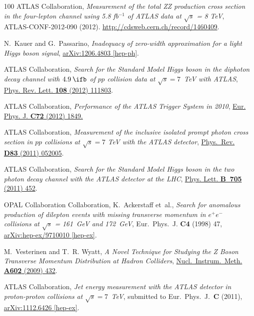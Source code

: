 \documentclass[final,3p,times,twocolumn]{elsarticle}
\begin{document}
\begin{thebibliography}{100}
{ATLAS Collaboration}, {\em Measurement of the total ZZ production cross
  section in the four-lepton channel using 5.8 fb$^{-1}$ of ATLAS data at
  $\sqrt{s}$ = 8 TeV}, {ATLAS-CONF-2012-090} (2012).
  \url{http://cdsweb.cern.ch/record/1460409}.

N.~Kauer and G.~Passarino, {\em {Inadequacy of zero-width approximation for a
  light Higgs boson signal}}, \href{http://arxiv.org/abs/1206.4803}{{\ttfamily
  arXiv:1206.4803 [hep-ph]}}.

{ATLAS Collaboration}, {\em {Search for the Standard Model Higgs boson in the
  diphoton decay channel with $4.9\:\ifb$ of $pp$ collision data at $\sqrt{s} =
  7$~TeV with ATLAS}},
  \href{http://dx.doi.org/10.1103/PhysRevLett.108.111803}{Phys. Rev. Lett.
  {\bfseries 108} (2012) 111803}.

{ATLAS Collaboration}, {\em {Performance of the ATLAS Trigger System in 2010}},
  \href{http://dx.doi.org/10.1140/epjc/s10052-011-1849-1}{Eur. Phys. J. {\bfseries C72} (2012) 1849.}

{ATLAS} Collaboration, {\em {Measurement of the inclusive isolated prompt
  photon cross section in $pp$ collisions at $\sqrt{s} = 7$ TeV with the ATLAS
  detector}}, \href{http://dx.doi.org/10.1103/PhysRevD.83.052005}{Phys.~Rev.
  {\bfseries D83} (2011) 052005}.

{ATLAS Collaboration}, {\em {Search for the Standard Model Higgs boson in the
  two photon decay channel with the ATLAS detector at the LHC}},
  \href{http://dx.doi.org/10.1016/j.physletb.2011.10.051}{Phys. Lett.
  {\bfseries B~705} (2011) 452}.

{OPAL Collaboration} Collaboration, K.~Ackerstaff {et~al.}, {\em {Search for
  anomalous production of dilepton events with missing transverse momentum in
  $e^+e^-$ collisions at $\sqrt{s}$ = 161~GeV and 172~GeV}},
  {Eur.~Phys.~J. {\bfseries C4}
  (1998) 47},
\href{http://arxiv.org/abs/hep-ex/9710010}{{\ttfamily arXiv:hep-ex/9710010
  [hep-ex]}}.

M.~Vesterinen and T.~R. Wyatt, {\em {A Novel Technique for Studying the Z Boson
  Transverse Momentum Distribution at Hadron Colliders}},
  \href{http://dx.doi.org/10.1016/j.nima.2009.01.203}{Nucl.~Instrum.~Meth.
  {\bfseries A602} (2009) 432}.

{ATLAS} Collaboration, {\em {Jet energy measurement with the ATLAS detector in
  proton-proton collisions at $\sqrt{s} = 7$~TeV}}, submitted to
  Eur.~Phys.~J.~{\bf C} (2011),
  \href{http://arxiv.org/abs/1112.6426}{{\ttfamily arXiv:1112.6426 [hep-ex]}}.


\end{thebibliography}
\end{document}
